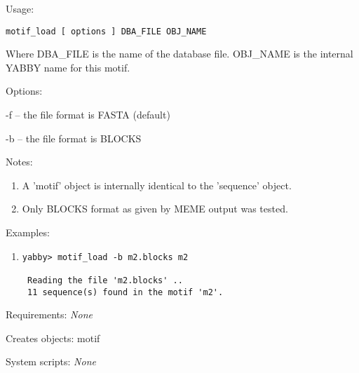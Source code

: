 \begin{description}


\item{Usage:}

{\tt motif\_load [ options ] DBA\_FILE OBJ\_NAME}

 Where DBA\_FILE is the name of the database file. OBJ\_NAME is
 the internal YABBY name for this motif.


\item{Options:}
\begin{description}
\item -f -- the file format is FASTA (default)
\item -b -- the file format is BLOCKS
\end{description}


\item{Notes:}
\begin{enumerate}
\item A 'motif' object is internally identical to the 'sequence' object.
\item Only BLOCKS format as given by MEME output was tested.
\end{enumerate}


\item{Examples:}
\begin{enumerate}

\item
\begin{verbatim}
yabby> motif_load -b m2.blocks m2

 Reading the file 'm2.blocks' ..
 11 sequence(s) found in the motif 'm2'.

\end{verbatim}

\end{enumerate}


\item{Requirements:} {\em None}


\item{Creates objects:} motif


\item{System scripts:} {\em None}

\end{description}


